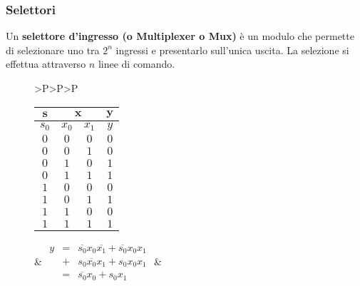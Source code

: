 \documentclass[a4paper]{extarticle}
\renewcommand\arraystretch{}
\begin{document}
\vspace{1em}
\subsubsection{Selettori}
Un \textbf{selettore d’ingresso (o Multiplexer o Mux)} è un modulo che permette di selezionare uno tra \(2^n\) ingressi e presentarlo sull’unica uscita. La selezione si effettua attraverso \(n\) linee di comando.\\

\begin{figure}[H]
  \begin{tabularx}{\textwidth}{>{\textwidth}P>{\textwidth}P>{\textwidth}P}
    {
        \setlength{\tabcolsep}{5pt}
        \renewcommand{\arraystretch}{1}
        \begin{tabular}{c|cc||c}
          $\boldsymbol{s}$ & \multicolumn{2}{c||}{$\boldsymbol{x}$} & $\boldsymbol{y}$\\
          \hline
          $s_0$ & $x_0$ & $x_1$ & $y$\\
          \hline
          $0$ & $0$ & $0$ & $0$\\
          $0$ & $0$ & $1$ & $0$\\
          $0$ & $1$ & $0$ & $1$\\
          $0$ & $1$ & $1$ & $1$\\
          $1$ & $0$ & $0$ & $0$\\
          $1$ & $0$ & $1$ & $1$\\
          $1$ & $1$ & $0$ & $0$\\
          $1$ & $1$ & $1$ & $1$\\
        \end{tabular}
    } & {
        \renewcommand{\arraystretch}{1.1}
        $\begin{array}{rcl}
            y & = & \overline{s_0}x_0\overline{x_1} + \overline{s_0}x_0x_1\\
              & + & s_0\overline{x_0}x_1 + s_0x_0x_1\\
              & = & \overline{s_0}x_0 + s_0x_1
        \end{array}$
    } & {
      \hspace{-3em}
      }
\end{tabularx}
\end{figure}
\end{document}
